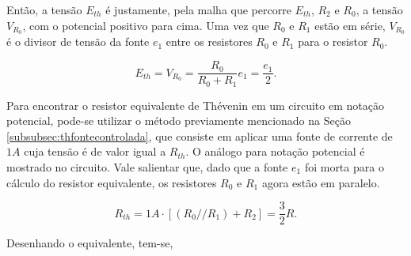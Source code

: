 \documentclass{article}
\numberwithin{equation}{section}
\newlength\Colsep
\let\dfr\dfrac
\begin{document}
\vspace{2cm}

\noindent Então, a tensão $E_{th}$ é justamente, pela malha que percorre $E_{th}$, $R_2$ e $R_0$, a tensão $V_{R_0}$, com o potencial positivo para cima. Uma vez que $R_0$ e $R_1$ estão em série, $V_{R_0}$ é o divisor de tensão da fonte $e_1$ entre os resistores $R_0$ e $R_1$ para o resistor $R_0$.

\begin{equation*}
    E_{th} = V_{R_0} = \dfr{R_0}{R_0+R_1}e_1 = \dfr{e_1}{2}.
\end{equation*}

\vspace{2cm}

\noindent\begin{minipage}{0.95\textwidth}
\begin{minipage}[c][3cm][c]{\dimexpr0.6\textwidth-0.5\Colsep\relax}
    \begin{center}
    \end{center}
\end{minipage} \hfill
\begin{minipage}[c][3cm][c]{\dimexpr0.4\textwidth-0.5\Colsep\relax}
    Para encontrar o resistor equivalente de Thévenin em um circuito em notação potencial, pode-se utilizar o método previamente mencionado na Seção \ref{subsubsec:thfontecontrolada}, que consiste em aplicar uma fonte de corrente de $1A$ cuja tensão é de valor igual a $R_{th}$. O análogo para notação potencial é mostrado no circuito. Vale salientar que, dado que a fonte $e_1$ foi morta para o cálculo do resistor equivalente, os resistores $R_0$ e $R_1$ agora estão em paralelo.
\end{minipage}
\end{minipage}

\vspace{2cm}

\begin{equation*}
    R_{th} = 1A\cdot[(R_0//R_1)+R_2] = \dfr{3}{2}R.
\end{equation*}

\noindent Desenhando o equivalente, tem-se,
\end{document}
